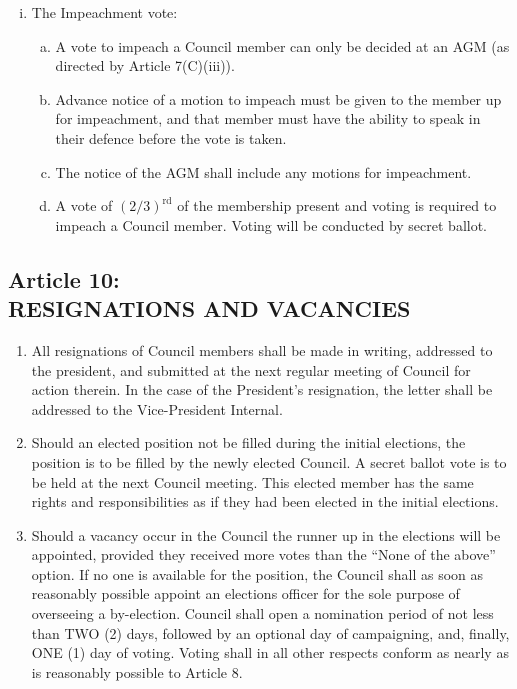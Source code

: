 \documentclass[]{report}
\begin{document}
\begin{enumerate}
\begin{enumerate}[i.]
				\item The Impeachment vote:
					\begin{enumerate}[(a)]
						\item A vote to impeach a Council member can only be decided at an AGM (as directed by Article 7(C)(iii)).
						\item Advance notice of a motion to impeach must be given to the member up for impeachment, and that member must have the ability to speak in their defence before the vote is taken.
						\item The notice of the AGM shall include any motions for impeachment.
						\item A vote of $ (2/3)^{\mathrm{rd}} $ of the membership present and voting is required to impeach a Council member. Voting will be conducted by secret ballot. 
					\end{enumerate}
			\end{enumerate}
	\end{enumerate}


\clearpage
\begin{center}
	\section*{Article 10:\\RESIGNATIONS AND VACANCIES}
	\vspace{12px}
\end{center}
\label{resignVacancies}
	\renewcommand{\theenumi}{\Alph{enumi}}
	\begin{enumerate}
	
		\item All resignations of Council members shall be made in writing, addressed to the president, and submitted at the next regular meeting of Council for action therein. In the case of the President's resignation, the letter shall be addressed to the Vice-President Internal.
		\item Should an elected position not be filled during the initial elections, the position is to be filled by the newly elected Council. A secret ballot vote is to be held at the next Council meeting. This elected member has the same rights and responsibilities as if they had been elected in the initial elections.
		\item Should a vacancy occur in the Council the runner up in the elections will be appointed, provided they received more votes than the “None of the above” option. If no one is available for the position, the Council shall as soon as reasonably possible appoint an elections officer for the sole purpose of overseeing a by-election. Council shall open a nomination period of not less than TWO (2) days, followed by an optional day of campaigning, and, finally, ONE (1) day of voting. Voting shall in all other respects conform as nearly as is reasonably possible to Article 8.
	
	\end{enumerate}
\end{document}
